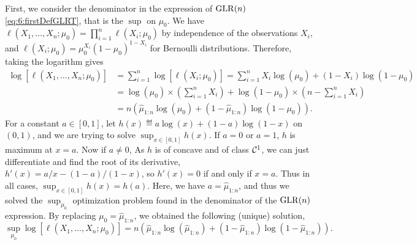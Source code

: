     First, we consider the denominator in the expression of $\mathrm{GLR}(n)$ \eqref{eq:6:firstDefGLRT}, that is the $\sup$ on $\mu_0$.
    We have $\ell(X_1, \dots, X_n ; \mu_0) = \prod\limits_{i=1}^n \ell(X_i ; \mu_0)$ by independence of the observations $X_i$,
    and $\ell(X_i ; \mu_0) = \mu_0^{X_i} (1-\mu_0)^{1-X_i}$ for Bernoulli distributions.
    Therefore, taking the logarithm gives
    \begin{align*}
        \log \left[ \ell(X_1, \dots, X_n ; \mu_0) \right]
        &= \sum_{i=1}^n \log \left[ \ell(X_i ; \mu_0) \right]
        = \sum_{i=1}^n X_i \log(\mu_0) + (1-X_i) \log(1-\mu_0) \\
        &= \log(\mu_0) \times \left( \sum_{i=1}^n X_i \right) + \log(1-\mu_0) \times \left( n - \sum_{i=1}^n X_i \right) \\
        &= n \left( \widehat{\mu}_{1:n} \log(\mu_0) + (1 - \widehat{\mu}_{1:n}) \log(1-\mu_0) \right).
    \end{align*}
    For a constant $a\in[0,1]$, let $h(x) \eqdef a \log(x) + (1-a) \log(1-x)$ on $(0,1)$,
    and we are trying to solve $\sup_{x\in[0,1]} h(x)$.
    If $a=0$ or $a=1$, $h$ is maximum at $x=a$.
    Now if $a\neq0$, As $h$ is of concave and of class $\mathcal{C}^1$, we can just differentiate and find the root of its derivative,
    $h'(x) = a/x - (1-a)/(1-x)$, so $h'(x) = 0$ if and only if $x=a$.
    Thus in all cases, $\sup_{x\in[0,1]} h(x) = h(a)$.
    Here, we have $a = \widehat{\mu}_{1:n}$, and thus we solved the $\sup_{\mu_0}$ optimization problem found in the denominator of the $\mathrm{GLR}(n)$ expression.
    By replacing $\mu_0 = \widehat{\mu}_{1:n}$, we obtained the following (unique) solution,
    \begin{equation}\label{eq:6:solutionPbOpt_for_1n}
        \sup_{\mu_0} \log \left[ \ell(X_1, \dots, X_n ; \mu_0) \right] = n \left( \widehat{\mu}_{1:n} \log(\widehat{\mu}_{1:n}) + (1 - \widehat{\mu}_{1:n}) \log(1-\widehat{\mu}_{1:n}) \right).
    \end{equation}

